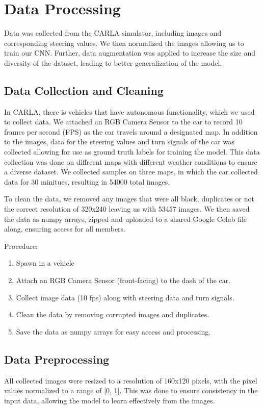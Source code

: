 \documentclass{article} %
\begin{document}
\section{Data Processing}

Data was collected from the CARLA simulator, including images and corresponding steering values. We then normalized the images allowing us to train our CNN.
Further, data augmentation was applied to increase the size and diversity of the dataset, leading to better generalization of the model.


\subsection{Data Collection and Cleaning}

In CARLA, there is vehicles that have autonomous functionality, which we used to collect data.
We attached an RGB Camera Sensor to the car to record 10 frames per second (FPS) as the car
travels around a designated map. In addition to the images, data for the steering values and turn signals of the car
was collected allowing for use as ground truth labels for training the model. This data collection was done on diffreent maps with different weather conditions
to ensure a diverse dataset. We collected samples on three maps, in which the car collected data for 30 minitues, resulting in 54000 total images.


To clean the data, we removed any images that were all black, duplicates or not the correct resolution of 320x240 leaving us with 53457 images.  We then saved 
the data as numpy arrays, zipped and uploaded to a shared Google Colab file along, ensuring access for all members. 

Procedure:
\begin{enumerate}
  \item{Spawn in a vehicle}
  \item{Attach an RGB Camera Sensor (front-facing) to the dash of the car.}
  \item{Collect image data (10 fps) along with steering data and turn signals.}
  \item {Clean the data by removing corrupted images and duplicates.}
  \item {Save the data as numpy arrays for easy access and processing.}
\end{enumerate}


\subsection{Data Preprocessing}
All collected images were resized to a resolution of 160x120 pixels, with the pixel values normalized to a range of [0, 1]. 
This was done to ensure consistency in the input data, allowing the model to learn effectively from the images.
\end{document}
